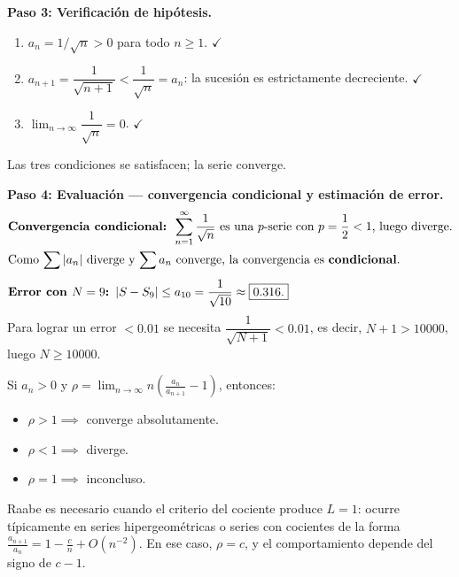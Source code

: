 \begin{example}
\begin{myproof}
\textbf{Paso 3: Verificación de hipótesis.}
\begin{enumerate}
  \item $a_n = 1/\sqrt{n} > 0$ para todo $n \geq 1$. $\checkmark$
  \item $a_{n+1} = \dfrac{1}{\sqrt{n+1}} < \dfrac{1}{\sqrt{n}} = a_n$:
        la sucesión es estrictamente decreciente. $\checkmark$
  \item $\lim_{n\to\infty} \dfrac{1}{\sqrt{n}} = 0$. $\checkmark$
\end{enumerate}
Las tres condiciones se satisfacen; la serie converge.

\textbf{Paso 4: Evaluación — convergencia condicional y estimación de error.}
\begin{align*}
  &\textbf{Convergencia condicional: } \sum_{n=1}^\infty \frac{1}{\sqrt{n}}
   \text{ es una $p$-serie con $p=\frac{1}{2}<1$, luego diverge.} \\
  &\text{Como $\sum|a_n|$ diverge y $\sum a_n$ converge, la convergencia
   es \textbf{condicional}.} \\[4pt]
  &\textbf{Error con $N=9$: } |S - S_9| \leq a_{10} = \frac{1}{\sqrt{10}}
   \approx \boxed{0.316.}
\end{align*}
Para lograr un error $< 0.01$ se necesita $\dfrac{1}{\sqrt{N+1}} < 0.01$,
es decir, $N+1 > 10000$, luego $N \geq 10000$.
\end{myproof}
\end{example}


\begin{theorem}
Si $a_n > 0$ y $\displaystyle\rho = \lim_{n\to\infty} n\!\left(
\frac{a_n}{a_{n+1}}-1\right)$, entonces:
\begin{itemize}
  \item $\rho > 1 \implies$ converge absolutamente.
  \item $\rho < 1 \implies$ diverge.
  \item $\rho = 1 \implies$ inconcluso.
\end{itemize}
\end{theorem}

\begin{rem}
Raabe es necesario cuando el criterio del cociente produce $L=1$: ocurre
típicamente en series hipergeométricas o series con cocientes de la forma
$\frac{a_{n+1}}{a_n} = 1 - \frac{c}{n} + O(n^{-2})$. En ese caso,
$\rho = c$, y el comportamiento depende del signo de $c-1$.
\end{rem}

